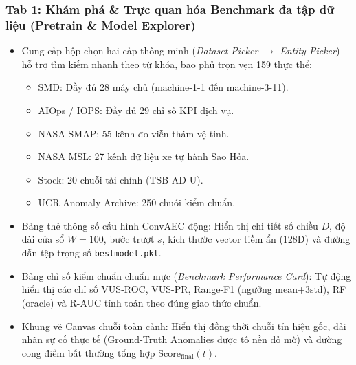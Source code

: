 \documentclass[11pt,journal,onecolumn]{IEEEtran}
\begin{document}
\subsubsection{Tab 1: Khám phá \& Trực quan hóa Benchmark đa tập dữ liệu (Pretrain \& Model Explorer)}
\begin{itemize}
    \item Cung cấp hộp chọn hai cấp thông minh (\textit{Dataset Picker $\rightarrow$ Entity Picker}) hỗ trợ tìm kiếm nhanh theo từ khóa, bao phủ trọn vẹn 159 thực thể:
    \begin{itemize}
        \item SMD: Đầy đủ 28 máy chủ (machine-1-1 đến machine-3-11).
        \item AIOps / IOPS: Đầy đủ 29 chỉ số KPI dịch vụ.
        \item NASA SMAP: 55 kênh đo viễn thám vệ tinh.
        \item NASA MSL: 27 kênh dữ liệu xe tự hành Sao Hỏa.
        \item Stock: 20 chuỗi tài chính (TSB-AD-U).
        \item UCR Anomaly Archive: 250 chuỗi kiểm chuẩn.
    \end{itemize}
    \item Bảng thẻ thông số cấu hình ConvAEC động: Hiển thị chi tiết số chiều $D$, độ dài cửa sổ $W=100$, bước trượt $s$, kích thước vector tiềm ẩn (128D) và đường dẫn tệp trọng số \texttt{bestmodel.pkl}.
    \item Bảng chỉ số kiểm chuẩn chuẩn mực (\textit{Benchmark Performance Card}): Tự động hiển thị các chỉ số VUS-ROC, VUS-PR, Range-F1 (ngưỡng mean+3std), RF (oracle) và R-AUC tính toán theo đúng giao thức chuẩn.
    \item Khung vẽ Canvas chuỗi toàn cảnh: Hiển thị đồng thời chuỗi tín hiệu gốc, dải nhãn sự cố thực tế (Ground-Truth Anomalies được tô nền đỏ mờ) và đường cong điểm bất thường tổng hợp $\text{Score}_{\text{final}}(t)$.
\end{itemize}
\end{document}
